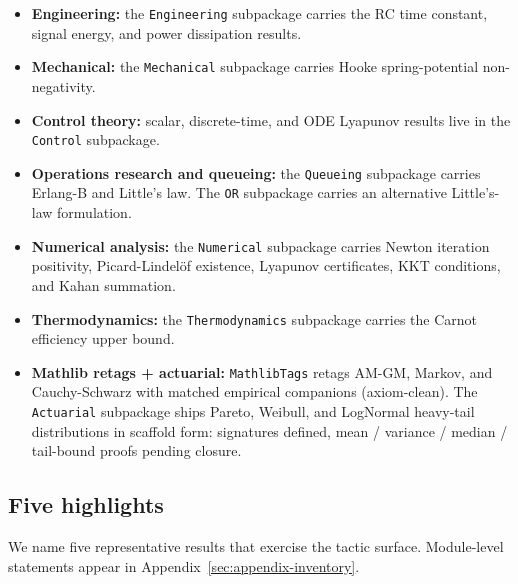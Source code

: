 \begin{itemize}[leftmargin=1.3em,itemsep=0.2em]
  concavity, CAPM linear pricing, risk-neutral call
  non-negativity, and Walras excess-demand identity.
\item \textbf{Engineering:} the \texttt{Engineering} subpackage
  carries the RC time constant, signal energy, and power
  dissipation results.
\item \textbf{Mechanical:} the \texttt{Mechanical} subpackage
  carries Hooke spring-potential non-negativity.
\item \textbf{Control theory:} scalar, discrete-time, and ODE
  Lyapunov results live in the \texttt{Control} subpackage.
\item \textbf{Operations research and queueing:} the
  \texttt{Queueing} subpackage carries Erlang-B and Little's law.
  The \texttt{OR} subpackage carries an alternative Little's-law
  formulation.
\item \textbf{Numerical analysis:} the \texttt{Numerical}
  subpackage carries Newton iteration positivity, Picard-Lindelöf
  existence, Lyapunov certificates, KKT conditions, and Kahan
  summation.
\item \textbf{Thermodynamics:} the \texttt{Thermodynamics}
  subpackage carries the Carnot efficiency upper bound.
\item \textbf{Mathlib retags + actuarial:} \texttt{MathlibTags}
  retags AM-GM, Markov, and Cauchy-Schwarz with matched empirical
  companions (axiom-clean). The \texttt{Actuarial} subpackage
  ships Pareto, Weibull, and LogNormal heavy-tail distributions
  in scaffold form: signatures defined, mean / variance / median
  / tail-bound proofs pending closure.
\end{itemize}

\subsection{Five highlights}
\label{sec:library-highlights}

We name five representative results that exercise the tactic surface.
Module-level statements appear in
Appendix~\ref{sec:appendix-inventory}.

